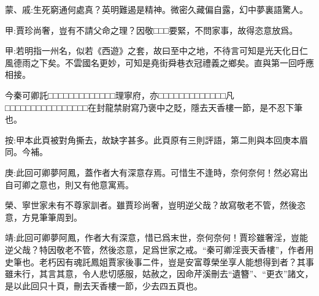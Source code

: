 
\begin{parag}
    \begin{note}蒙、戚:生死窮通何處真？英明難遏是精神。微密久藏偏自露，幻中夢裏語驚人。\end{note}
\end{parag}


\begin{parag}
    \begin{note}甲:賈珍尚奢，豈有不請父命之理？因敬□□□要緊，不問家事，故得恣意放爲。\end{note}
\end{parag}


\begin{parag}
    \begin{note}
        甲:若明指一州名，似若《西遊》之套，故曰至中之地，不待言可知是光天化日仁風德雨之下矣。不雲國名更妙，可知是堯街舜巷衣冠禮義之鄉矣。直與第一回呼應相接。
    \end{note}
\end{parag}


\begin{parag}
    \begin{note}
        今秦可卿託□□□□□□□□□□□□□理寧府，亦□□□□□□□□□□□□□凡□□□□□□□□□□□□□□□□在封龍禁尉寫乃褒中之貶，隱去天香樓一節，是不忍下筆也。
    \end{note}
    \begin{subnote}按:甲本此頁被對角撕去，故缺字甚多。此頁原有三則評語，第二則與本回庚本眉同。今補。\end{subnote}
\end{parag}


\begin{parag}
    \begin{note}
        庚:此回可卿夢阿鳳，蓋作者大有深意存焉。可惜生不逢時，奈何奈何！然必寫出自可卿之意也，則又有他意寓焉。
    \end{note}
\end{parag}


\begin{parag}
    \begin{note}
        榮、寧世家未有不尊家訓者。雖賈珍尚奢，豈明逆父哉？故寫敬老不管，然後恣意，方見筆筆周到。
    \end{note}
\end{parag}


\begin{parag}
    \begin{note}靖:此回可卿夢阿鳳，作者大有深意，惜已爲末世，奈何奈何！賈珍雖奢淫，豈能逆父哉？特因敬老不管，然後恣意，足爲世家之戒。“秦可卿淫喪天香樓”，作者用史筆也。老朽因有魂託鳳姐賈家後事二件，豈是安富尊榮坐享人能想得到者？其事雖未行，其言其意，令人悲切感服，姑赦之，因命芹溪刪去“遺簪”、“更衣”諸文，是以此回只十頁，刪去天香樓一節，少去四五頁也。\end{note}
\end{parag}



